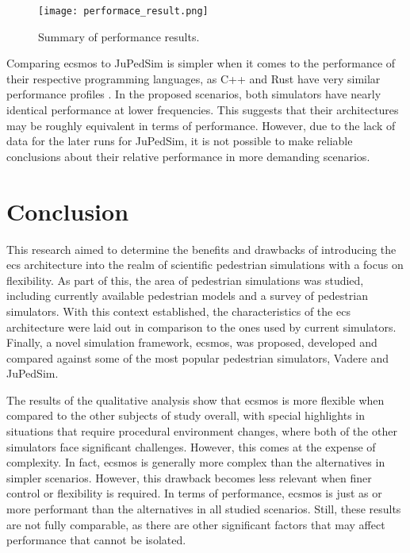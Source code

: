 \documentclass[twoside, 11pt]{article}
\begin{document}
\begin{figure}
  \centering
  \texttt{[image: performace\_result.png]}
  \caption[Summary of performance results]{Summary of performance results.}
  \label{fig:performace-results}
\end{figure}

Comparing \gls{ecsmos} to JuPedSim is simpler when it comes to the performance of their respective programming languages, as C++ and Rust have very similar performance profiles \cite{electronics12010143}. In the proposed scenarios, both simulators have nearly identical performance at lower frequencies. This suggests that their architectures may be roughly equivalent in terms of performance. However, due to the lack of data for the later runs for JuPedSim, it is not possible to make reliable conclusions about their relative performance in more demanding scenarios.




\section{Conclusion} \label{sec:conclusion}

This research aimed to determine the benefits and drawbacks of introducing the \gls{ecs} architecture into the realm of scientific pedestrian simulations with a focus on flexibility. As part of this, the area of pedestrian simulations was studied, including currently available pedestrian models and a survey of pedestrian simulators. With this context established, the characteristics of the \gls{ecs} architecture were laid out in comparison to the ones used by current simulators. Finally, a novel simulation framework, \gls{ecsmos}, was proposed, developed and compared against some of the most popular pedestrian simulators, Vadere and JuPedSim.

The results of the qualitative analysis show that \gls{ecsmos} is more flexible when compared to the other subjects of study overall, with special highlights in situations that require procedural environment changes, where both of the other simulators face significant challenges. However, this comes at the expense of complexity. In fact, \gls{ecsmos} is generally more complex than the alternatives in simpler scenarios. However, this drawback becomes less relevant when finer control or flexibility is required. In terms of performance, \gls{ecsmos} is just as or more performant than the alternatives in all studied scenarios. Still, these results are not fully comparable, as there are other significant factors that may affect performance that cannot be isolated.
\end{document}
